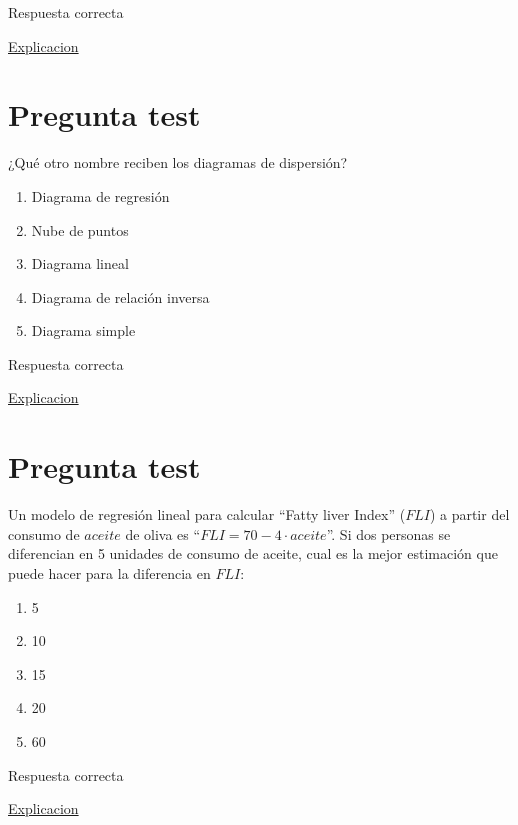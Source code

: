 \documentclass[
]{book}
\providecommand{\tightlist}{%
  \setlength{\itemsep}{0pt}\setlength{\parskip}{0pt}}
\begin{document}
Respuesta correcta

\href{https://1fjmanzano.github.io/bioestadistica/relaci\%C3\%B3n-entre-variables-nume\%CC\%81ricas.html\#coeficiente-de-correlacio\%CC\%81n}{Explicacion}

\hypertarget{pregunta-test-145}{%
\section{Pregunta test}\label{pregunta-test-145}}

¿Qué otro nombre reciben los diagramas de dispersión?

\begin{enumerate}
\def\labelenumi{\alph{enumi})}
\tightlist
\item
  Diagrama de regresión
\item
  Nube de puntos
\item
  Diagrama lineal
\item
  Diagrama de relación inversa
\item
  Diagrama simple
\end{enumerate}

Respuesta correcta

\href{https://1fjmanzano.github.io/bioestadistica/relaci\%C3\%B3n-entre-variables-nume\%CC\%81ricas.html\#diagramas-de-dispersio\%CC\%81n}{Explicacion}

\hypertarget{pregunta-test-146}{%
\section{Pregunta test}\label{pregunta-test-146}}

Un modelo de regresión lineal para calcular ``Fatty liver Index'' (\(FLI\)) a partir del consumo de \(aceite\) de oliva es ``\(FLI=70- 4 \cdot aceite\)''. Si dos personas se diferencian en 5 unidades de consumo de aceite, cual es la mejor estimación que puede hacer para la diferencia en \(FLI\):

\begin{enumerate}
\def\labelenumi{\alph{enumi})}
\tightlist
\item
  5
\item
  10
\item
  15
\item
  20
\item
  60
\end{enumerate}

Respuesta correcta

\href{https://1fjmanzano.github.io/bioestadistica/relaci\%C3\%B3n-entre-variables-nume\%CC\%81ricas.html\#regresio\%CC\%81n-lineal}{Explicacion}
\end{document}
